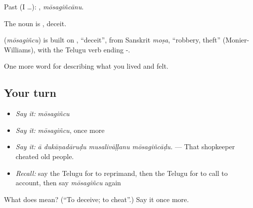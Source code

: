 Past (I …): , \emph{mōsagiñcānu}.

The noun is , deceit.

\begin{cousinweb}
\textbf{} (\emph{mōsagiñcu}) is built on , \textquotedblleft{}deceit\textquotedblright{}, from Sanskrit \emph{moṣa}, \textquotedblleft{}robbery, theft\textquotedblright{} (Monier-Williams), with the Telugu verb ending -.
\end{cousinweb}

\begin{grammarlens}[title={What you've built}]
One more word for describing what you lived and felt.
\end{grammarlens}

\subsection*{Your turn}
\begin{itemize}
\raggedright
  \item \emph{Say it:} \emph{mōsagiñcu}
  \item \emph{Say it:} \emph{mōsagiñcu}, once more
  \item \emph{Say it:} \emph{ā dukāṇadāruḍu musalivāḷḷanu mōsagiñcāḍu.} — That shopkeeper cheated old people.
  \item \emph{Recall:} say the Telugu for to reprimand, then the Telugu for to call to account, then say \emph{mōsagiñcu} again
\end{itemize}

\begin{tcolorbox}[breakable,colback=teal!4,colframe=teal!35!black,title={Before you move on}]
What does  mean? (\textquotedblleft{}To deceive; to cheat\textquotedblright{}.) Say it once more.
\end{tcolorbox}

